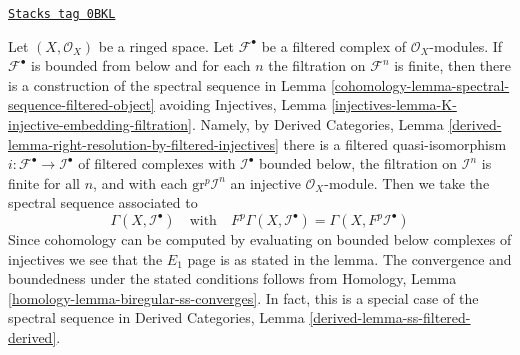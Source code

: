 \begin{remark}
\label{cohomology-remark-spectral-sequence-filtered-object}
\href{https://stacks.math.columbia.edu/tag/0BKL}{\texttt{Stacks tag 0BKL}}

Let $(X, \mathcal{O}_X)$ be a ringed space. Let $\mathcal{F}^\bullet$ be a
filtered complex of $\mathcal{O}_X$-modules. If $\mathcal{F}^\bullet$
is bounded from below and for each $n$ the filtration on $\mathcal{F}^n$
is finite, then there is a construction of the spectral sequence
in Lemma \ref{cohomology-lemma-spectral-sequence-filtered-object}
avoiding Injectives, Lemma
\ref{injectives-lemma-K-injective-embedding-filtration}.
Namely, by
Derived Categories, Lemma
\ref{derived-lemma-right-resolution-by-filtered-injectives}
there is a filtered quasi-isomorphism
$i : \mathcal{F}^\bullet \to \mathcal{I}^\bullet$
of filtered complexes
with $\mathcal{I}^\bullet$ bounded below,
the filtration on $\mathcal{I}^n$ is finite for all $n$,
and with each $\text{gr}^p\mathcal{I}^n$ an
injective $\mathcal{O}_X$-module.
Then we take the spectral sequence associated to
$$
\Gamma(X, \mathcal{I}^\bullet)
\quad\text{with}\quad
F^p\Gamma(X, \mathcal{I}^\bullet) = \Gamma(X, F^p\mathcal{I}^\bullet)
$$
Since cohomology can be computed by evaluating on
bounded below complexes of injectives
we see that the $E_1$ page is as stated in the lemma.
The convergence and boundedness under the stated conditions
follows from
Homology, Lemma \ref{homology-lemma-biregular-ss-converges}.
In fact, this is a special case of the spectral sequence
in Derived Categories, Lemma \ref{derived-lemma-ss-filtered-derived}.
\end{remark}

